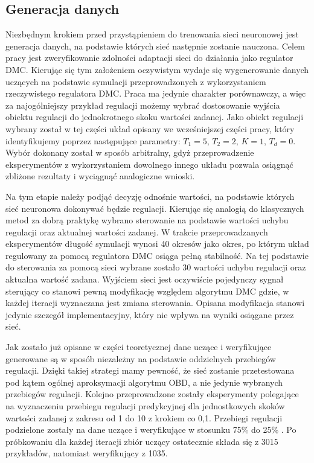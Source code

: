 \subsection{Generacja danych}
Niezbędnym krokiem przed przystąpieniem do trenowania sieci neuronowej jest generacja danych, na podstawie których sieć następnie zostanie nauczona. Celem pracy jest zweryfikowanie zdolności adaptacji sieci do działania jako regulator DMC. Kierując się tym założeniem oczywistym wydaje się wygenerowanie danych uczących na podstawie symulacji przeprowadzonych z wykorzystaniem rzeczywistego regulatora DMC. Praca ma jedynie charakter porównawczy, a więc za najogólniejszy przykład regulacji możemy wybrać dostosowanie wyjścia obiektu regulacji do jednokrotnego skoku wartości zadanej. Jako obiekt regulacji wybrany został w tej części układ opisany we wcześniejszej części pracy, który identyfikujemy poprzez następujące parametry: \( T_1=5, \, T_2=2, \, K=1, \, T_d=0 \). Wybór dokonany został w sposób arbitralny, gdyż przeprowadzenie eksperymentów z wykorzystaniem dowolnego innego układu pozwala osiągnąć zbliżone rezultaty i wyciągnąć analogiczne wnioski.
\par Na tym etapie należy podjąć decyzję odnośnie wartości, na podstawie których sieć neuronowa dokonywać będzie regulacji. Kierując się analogią do klasycznych metod za dobrą praktykę wybrano sterowanie na podstawie wartości uchybu regulacji oraz aktualnej wartości zadanej. W trakcie przeprowadzanych eksperymentów długość symulacji wynosi 40 okresów jako okres, po którym układ regulowany za pomocą regulatora DMC osiąga pełną stabilność. Na tej podstawie do sterowania za pomocą sieci wybrane zostało 30 wartości uchybu regulacji oraz aktualna wartość zadana. Wyjściem sieci jest oczywiście pojedynczy sygnał sterujący co stanowi pewną modyfikację względem algorytmu DMC gdzie, w każdej iteracji wyznaczana jest zmiana sterowania. Opisana modyfikacja stanowi jedynie szczegół implementacyjny, który nie wpływa na wyniki osiągane przez sieć.
\par Jak zostało już opisane w części teoretycznej dane uczące i weryfikujące generowane są w sposób niezależny na podstawie oddzielnych przebiegów regulacji. Dzięki takiej strategi mamy pewność, że sieć zostanie przetestowana pod kątem ogólnej aproksymacji algorytmu OBD, a nie jedynie wybranych przebiegów regulacji. Kolejno przeprowadzone zostały eksperymenty polegające na wyznaczeniu przebiegu regulacji predykcyjnej dla jednostkowych skoków wartości zadanej z zakresu od 1 do 10 z krokiem co 0,1. Przebiegi regulacji podzielone zostały na dane uczące i weryfikujące w stosunku 75\% do 25\% . Po próbkowaniu dla każdej iteracji zbiór uczący ostatecznie składa się z 3015 przykładów, natomiast weryfikujący z 1035.
